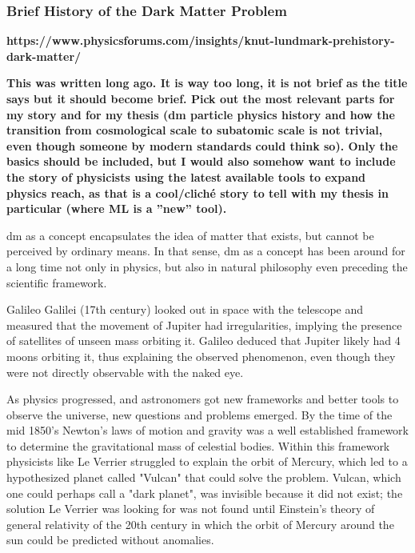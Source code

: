 \subsubsection{Brief History of the Dark Matter Problem}
\label{sec:history}



\textbf{https://www.physicsforums.com/insights/knut-lundmark-prehistory-dark-matter/}

\textbf{This was written long ago. It is way too long, it is not brief as the title says but it should become brief. Pick out the most relevant parts for my story and for my thesis (\gls{dm} particle physics history and how the transition from cosmological scale to subatomic scale is not trivial, even though someone by modern standards could think so). Only the basics should be included, but I would also somehow want to include the story of physicists using the latest available tools to expand physics reach, as that is a cool/cliché story to tell with my thesis in particular (where ML is a ''new'' tool).}

\gls{dm} as a concept encapsulates the idea of matter that exists, but cannot be perceived by ordinary means. In that sense, \gls{dm} as a concept has been around for a long time not only in physics, but also in natural philosophy even preceding the scientific framework. \cite{bertone2016-history-dark-matter}

Galileo Galilei (17th century) looked out in space with the telescope and measured that the movement of Jupiter had irregularities, implying the presence of satellites of unseen mass orbiting it. Galileo deduced that Jupiter likely had 4 moons orbiting it, thus explaining the observed phenomenon, even though they were not directly observable with the naked eye. \cite{bertone2016-history-dark-matter}

As physics progressed, and astronomers got new frameworks and better tools to observe the universe, new questions and problems emerged. By the time of the mid 1850’s Newton’s laws of motion and gravity was a well established framework to determine the gravitational mass of celestial bodies. Within this framework physicists like Le Verrier struggled to explain the orbit of Mercury, which led to a hypothesized planet called "Vulcan" that could solve the problem. Vulcan, which one could perhaps call a "dark planet", was invisible because it did not exist; the solution Le Verrier was looking for was not found until Einstein's theory of general relativity of the 20th century in which the orbit of Mercury around the sun could be predicted without anomalies. \cite{bertone2016-history-dark-matter}

